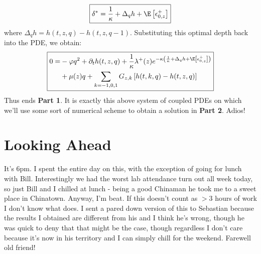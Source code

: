 \documentclass[12pt]{article}
\begin{document}
\begin{equation}\label{eq:depth}
\boxed{\delta^{*} = \dfrac{1}{\kappa} + \Delta_q h + \E \left[ \epsilon^+_{0,z} \right]}
\end{equation}
where $\Delta_q h = h(t,z,q) - h(t,z,q-1)$. Substituting this optimal depth back into the PDE, we obtain: 
\begin{equation}
\boxed{
\begin{split}0 = & - \varphi q^2 + \partial_t h(t,z,q) + \dfrac{1}{\kappa} \lambda^+(z) e^{ -\kappa \left( \frac{1}{\kappa} + \Delta_q h + \E \left[ \epsilon^+_{0,z} \right] \right) } \\
 & + \mu(z) q + \sum_{k=-1,0,1} G_{z,k} \left[ h(t,k,q) - h(t,z,q) \right]
\end{split}
}
\end{equation}
Thus ends \textbf{Part 1}. It is exactly this above system of coupled PDEs on which we'll use some sort of numerical scheme to obtain a solution in \textbf{Part 2}. Adios!

\section*{Looking Ahead}
It's 6pm. I spent the entire day on this, with the exception of going for lunch with Bill. Interestingly we had the worst lab attendance turn out all week today, so just Bill and I chilled at lunch - being a good Chinaman he took me to a sweet place in Chinatown. Anyway, I'm beat. If this doesn't count as $> 3$ hours of work I don't know what does. I sent a pared down version of this to Sebastian because the results I obtained are different from his and I think he's wrong, though he was quick to deny that that might be the case, though regardless I don't care because it's now in his territory and I can simply chill for the weekend. Farewell old friend!
\end{document}
